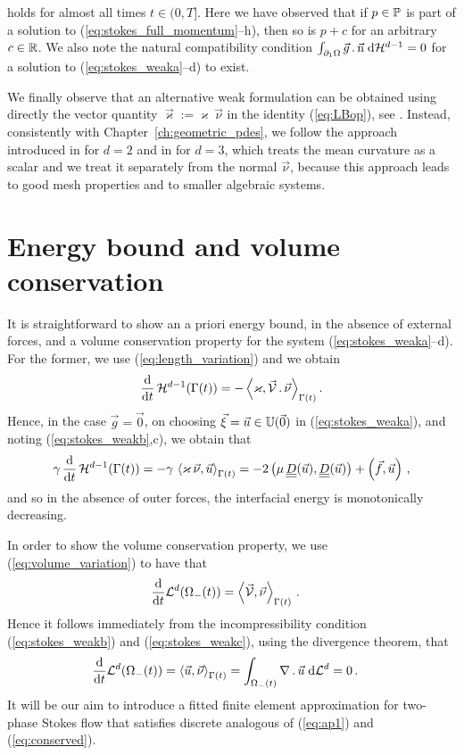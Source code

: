 holds for almost all times $t \in (0,T]$. Here we have observed that if
$p \in \mathbb{P}$ is part of a solution to (\ref{eq:stokes_full_momentum}--h),
then so is $p + c$ for an arbitrary $c\in \mathbb R$. We also note the natural
compatibility condition $\int_{\partial_1\Omega}\vec g\,.\,\vec{\rm n}\;{\rm d}{\cal H}^{d-1}=0$
for a solution to (\ref{eq:stokes_weaka}--d) to exist.

We finally observe that an alternative weak formulation can be obtained
using directly the vector quantity $\vec\varkappa:=\varkappa\,\vec\nu$
in the identity (\ref{eq:LBop}), see \cite{Dziuk91,Bansch01,GanesanMT07}.
Instead, consistently with Chapter~\ref{ch:geometric_pdes}, we follow the
approach introduced in \cite{triplej} for $d=2$ and in \cite{gflows3d} for
$d=3$, which treats the mean curvature as a scalar and we treat it
separately from the normal $\vec\nu$, because this approach leads to good mesh
properties and to smaller algebraic systems.

\section{Energy bound and volume conservation}\label{sec:stokes_energy}
It is straightforward to show an a priori energy bound, in the absence of
external forces, and a volume conservation property for the system
(\ref{eq:stokes_weaka}--d). For the former, we use (\ref{eq:length_variation})
and we obtain
\begin{equation}\label{eq:dtarea}
\frac{\rm d}{{\rm d}t}\,\mathcal{H}^{d-1}(\Gamma(t)) = -
\left\langle \varkappa,\vec{\mathcal{V}}\,.\,\vec\nu\right\rangle_{\Gamma(t)}.
\end{equation}
Hence, in the case $\vec g=\vec 0$, on choosing $\vec\xi = \vec u\in\mathbb{U}(\vec{0})$
in (\ref{eq:stokes_weaka}), and noting (\ref{eq:stokes_weakb},c), we obtain that
\begin{align}
\gamma\, \ddt\,\surfvol(\Gamma(t)) = -
\gamma\,\left\langle \varkappa\,\vec\nu, \vec u\right\rangle_{\Gamma(t)}
=  - 2\left(\mu\,\mat D(\vec u), \mat D(\vec u)\right) +
\left(\vec f, \vec u\right) \,,
\label{eq:ap1}
\end{align}
and so in the absence of outer forces, the interfacial energy is monotonically
decreasing.

In order to show the volume conservation property, we use
(\ref{eq:volume_variation}) to have that
\begin{align}
\frac{\rm d}{{\rm d}t} \mathcal{L}^d(\Omega_-(t)) & = \left\langle \vec{\mathcal{V}}, \vec\nu
\right\rangle_{\Gamma(t)}\,.
\end{align}
Hence it follows immediately from the incompressibility condition
(\ref{eq:stokes_weakb}) and (\ref{eq:stokes_weakc}), using the divergence
theorem, that
\begin{align}
\frac{\rm d}{{\rm d}t} \mathcal{L}^d(\Omega_-(t)) & = \left\langle \vec u , \vec\nu
\right\rangle_{\Gamma(t)}
 = \int_{\Omega_-(t)} \nabla\,.\,\vec u \;{\rm d}{\cal L}^{d} =0\,. \label{eq:conserved}
\end{align}
It will be our aim to introduce a fitted finite element approximation for
two-phase Stokes flow that satisfies discrete analogous of
(\ref{eq:ap1}) and (\ref{eq:conserved}).

